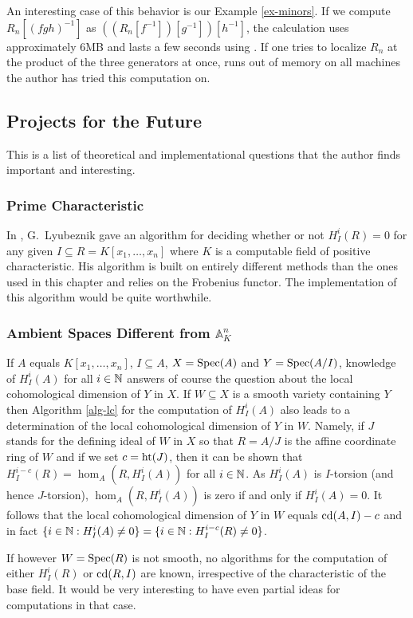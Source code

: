 An interesting case of this behavior is our Example \ref{ex-minors}. If we
compute $R_n[(fgh)^{-1}]$ as $((R_n[f^{-1}])[g^{-1}])[h^{-1}]$, 
the calculation uses
approximately 6MB and lasts a few seconds 
using \Mtwo. If one tries to localize $R_n$ at the
product of the three generators at once, \Mtwo 
runs out of memory on all machines the author has 
tried this computation on.
\subsection{Projects for the Future}
This is a list of theoretical and implementational questions that the
author finds 
important and interesting.
\subsubsection{Prime Characteristic} In \cite{DM:L-Fmod},
G.~Lyubeznik gave an
algorithm for deciding whether or not 
$H^i_I(R)=0$ for any given  $I\subseteq R=K[x_1,\ldots,x_n]$ where
$K$ is a computable field of positive characteristic. His algorithm is built on
entirely different methods than the ones used in this chapter 
and relies on the Frobenius functor. The
implementation of this algorithm would be quite worthwhile.
\subsubsection{Ambient Spaces Different from ${\mathbb A}^n_K$}
If $A$ equals $K[x_1,\ldots,x_n]$, 
$I\subseteq A$, $X=\operatorname{Spec} (A)$ and $Y=\operatorname{Spec}(A/I)$,
knowledge of $H^i_I(A)$ for all $i\in {\mathbb N}$ answers of course the
question about the local cohomological dimension of $Y$ in $X$. 
If $W\subseteq X$ is a smooth variety containing $Y$
then Algorithm \ref{alg-lc} for the computation of $H^i_I(A)$ also
leads to a determination of the local cohomological dimension of $Y$
in $W$. Namely, if $J$ stands for the
defining ideal of $W$ in $X$ so that $R=A/J$ is the affine
coordinate ring of $W$  and if we set $c=\operatorname{ht}(J)$, then it can be
shown that 
$H^{i-c}_{I}(R)=\hom_A(R,H^i_I(A))$ for all $i\in{\mathbb N}$.
As $H^i_I(A)$ is 
$I$-torsion (and hence $J$-torsion), $\hom_A(R,H^i_I(A))$ is zero if
and only if 
$H^i_I(A)=0$. It follows that the local cohomological dimension of $Y$
in $W$ equals $\operatorname{cd}(A,I)-c$ and in fact $\{i\in {\mathbb N}:H^i_I(A)\not =0\}=\{i\in
{\mathbb N}:H^{i-c}_I(R)\not =0\}$. 

If however $W=\operatorname{Spec}(R)$ is not smooth, no algorithms for the computation of
either $H^i_I(R)$ or $\operatorname{cd}(R,I)$ are known, irrespective of the
characteristic of the base field. It would be very interesting to have
even partial ideas for computations in that case.
